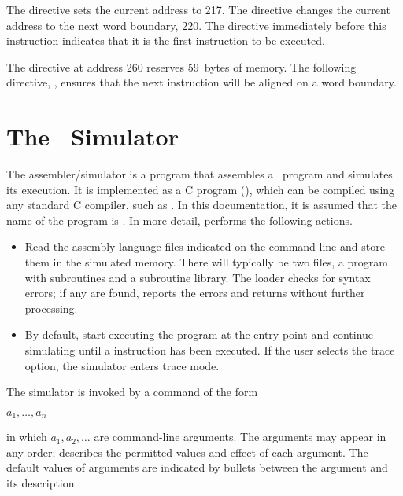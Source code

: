 The directive  sets the current address to 217. The
 directive changes the current address to the next word
boundary, 220. The directive  immediately before this
instruction indicates that it is the first instruction to be executed.

The directive  at address 260 reserves 59~bytes of memory.
The following directive, , ensures that the next instruction
will be aligned on a word boundary.

\section{The \moon\ Simulator}

The assembler/simulator is a program that assembles a \moon\ program and
simulates its execution. It is implemented as a C program (), 
which can be compiled using any standard C compiler, such as . 
In this documentation, it is assumed that the name of the program is . 
In more detail,  performs the following actions.

\begin{itemize}

\item Read the assembly language files indicated on the command line and
      store them in the simulated memory. There will typically be two
      files, a program with subroutines and a subroutine library. The
      loader checks for syntax errors; if any are found, 
      reports the errors and returns without further processing.

\item By default, start executing the program at the entry point and
      continue simulating until a  instruction has been
      executed. If the user selects the trace option, the simulator
      enters trace mode.

\end{itemize}

The simulator is invoked by a command of the form

\begin{prog}
 $a_1,\ldots,a_n$
\end{prog}

in which $a_1,a_2,\ldots$ are command-line arguments. The arguments may
appear in any order;  describes the permitted values and effect
of each argument. The default values of arguments are indicated by
bullets between the argument and its description.

